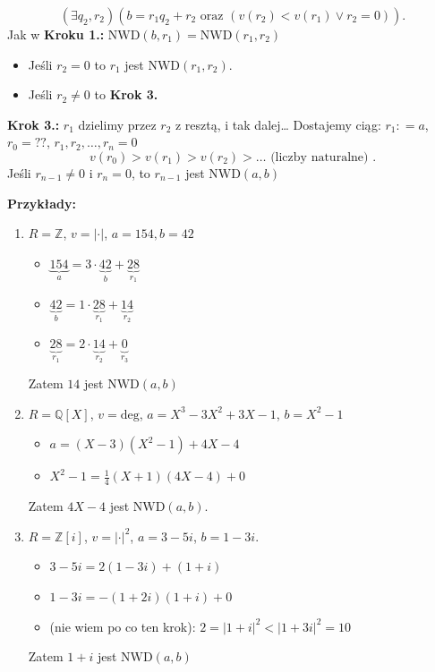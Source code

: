 \[
\left(\exists q_2,r_2 \right) \left( b = r_1q_2 + r_2  \text{ oraz } \left( v\left( r_2 \right) < v\left( r_1\right)  \lor r_2 = 0 \right) \right) 
.\] 
Jak w \textbf{Kroku 1.:} $\text{NWD}\left( b,r_1 \right) = \text{NWD}\left( r_1,r_2 \right) $ 
\begin{itemize}
	\item Jeśli $r_2 = 0$ to $r_1$ jest $\text{NWD}\left( r_1,r_2 \right) $.
	\item Jeśli $r_2\neq 0$ to \textbf{Krok 3.} 
\end{itemize}

\noindent \textbf{Krok 3.:} $r_1$ dzielimy przez $r_2$ z resztą, i tak dalej\ldots
Dostajemy ciąg: $r_1: = a$, $r_0 = ??$, $r_1,r_2,\ldots,r_{n} = 0$ 
\[
v\left( r_0 \right) > v\left( r_1 \right) > v\left( r_2 \right) > \ldots \text{ (liczby naturalne) }
.\] 
Jeśli $r_{n-1}\neq 0$ i $r_{n} = 0$, to $r_{n-1}$ jest $\text{NWD}\left( a,b \right) $

\noindent \textbf{Przykłady:}
\begin{enumerate}[label=\arabic*)]
	\item $R = \mathbb{Z} $, $v = \left| \cdot  \right| $, $a = 154, b = 42$ 
		\begin{itemize}
			\item $ \underbrace{154}_{a} = 3\cdot \underbrace{42}_{b} + \underbrace{28}_{r_1}$
			\item $\underbrace{42}_{b} = 1\cdot \underbrace{28}_{r_1}+ \underbrace{14}_{r_2}$ 
			\item $\underbrace{28}_{r_1} = 2\cdot \underbrace{14}_{r_2} + \underbrace{0}_{r_3}$
		\end{itemize}
		Zatem $14$ jest $\text{NWD}\left( a,b \right) $ 
	\item $R = \mathbb{Q} \left[ X \right] $, $v = \text{deg}$, $a = X^3-3X^2 + 3X -1$, $b= X^2-1$ 
		\begin{itemize}
			\item $a = \left( X-3 \right) \left( X^2-1 \right) + 4X - 4$
			\item $X^2 - 1 = \frac{1}{4}\left( X + 1 \right) \left( 4X - 4 \right) + 0$
		\end{itemize}
		Zatem $4X-4$ jest $\text{NWD}\left( a,b \right) $.
	\item $R = \mathbb{Z} \left[ i \right] $, $v = \left| \cdot  \right| ^2$, $a = 3-5i$, $b = 1-3i$. 
		\begin{itemize}
			\item $3-5i = 2\left( 1-3i \right) + \left( 1+i \right) $
			\item $1-3i = -\left( 1+2i \right)\left( 1+i \right) + 0  $ 
			\item (nie wiem po co ten krok): $2 = \left| 1+i \right| ^2 < \left| 1+3i \right|^2 = 10 $
		\end{itemize}
		Zatem $1+i$ jest $\text{NWD}\left( a,b \right) $
\end{enumerate}
